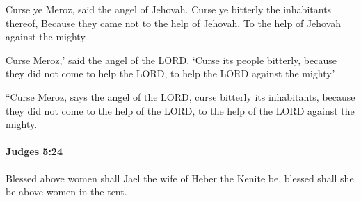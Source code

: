 			\begin{versebox}
					\item[BHS] 
					\item[ASV] Curse ye Meroz, said the angel of Jehovah. Curse ye bitterly the inhabitants thereof, Because they came not to the help of Jehovah, To the help of Jehovah against the mighty.
					\item[NIV] Curse Meroz,’ said the angel of the LORD. ‘Curse its people bitterly, because they did not come to help the LORD, to help the LORD against the mighty.’
					\item[NRSV] “Curse Meroz, says the angel of the LORD, curse bitterly its inhabitants, because they did not come to the help of the LORD, to the help of the LORD against the mighty.
			\end{versebox}

		\paragraph{Judges 5:24} %
			\label{JUDGES-5-24}

			Blessed above women shall Jael the wife of Heber the Kenite be, blessed shall she be above women in the tent.

